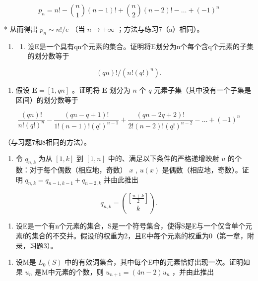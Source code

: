 \[
p _ {n} = n! - \binom {n} {1} (n - 1)! + \binom {n} {2} (n - 2)! - \dots + (- 1) ^ {n}
\]

* 从而得出 \(p_n \sim n! / e\) （当 \(n \to +\infty\) ；方法与练习7（a）相同）。

\begin{enumerate}
\def\labelenumi{\arabic{enumi}.}
\setcounter{enumi}{8}
\tightlist
\item
  \begin{enumerate}
  \def\labelenumii{(\alph{enumii})}
  \tightlist
  \item
    设E是一个具有qn个元素的集合。证明将E划分为n个每个含q个元素的子集的划分数等于
  \end{enumerate}
\end{enumerate}

\[
(q n)! / (n! (q!) ^ {n}).
\]

\begin{enumerate}
\def\labelenumi{(\alph{enumi})}
\setcounter{enumi}{1}
\tightlist
\item
  假设 \(\mathbf{E} = [1, qn]\) 。证明将 \(\mathbf{E}\) 划分为 \(n\) 个 \(q\) 元素子集（其中没有一个子集是区间）的划分数等于
\end{enumerate}

\[
\frac {(q n) !}{n ! (q !) ^ {n}} - \frac {(q n - q + 1) !}{1 ! (n - 1) ! (q !) ^ {n - 1}} + \frac {(q n - 2 q + 2) !}{2 ! (n - 2) ! (q !) ^ {n - 2}} - \dots + (- 1) ^ {n}
\]

（与习题7和8相同的方法）。

\begin{enumerate}
\def\labelenumi{\arabic{enumi}.}
\setcounter{enumi}{9}
\tightlist
\item
  令 \(q_{n,k}\) 为从 \([1, k]\) 到 \([1, n]\) 中的、满足以下条件的严格递增映射 \(u\) 的个数：对于每个偶数（相应地，奇数） \(x\) , \(u(x)\) 是偶数（相应地，奇数）。证明 \(q_{n,k} = q_{n-1, k-1} + q_{n-2, k}\) 并由此推出
\end{enumerate}

\[
q _ {n, k} = \binom {\left[ \frac {n + k}{2} \right]} {k}.
\]

\begin{enumerate}
\def\labelenumi{\arabic{enumi}.}
\setcounter{enumi}{10}
\tightlist
\item
  设E是一个有n个元素的集合，S是一个符号集合，使得S是E与一个仅含单个元素f的集合的不交并。假设f的权重为2，且E中每个元素的权重为0（第一章，附录，习题3）。
\end{enumerate}

\begin{enumerate}
\def\labelenumi{(\alph{enumi})}
\tightlist
\item
  设M是 \(L_{0}(S)\) 中的有效词集合，其中每个E中的元素恰好出现一次。证明如果 \(u_{n}\) 是M中元素的个数，则 \(u_{n+1} = (4n - 2)u_{n}\) ，并由此推出
\end{enumerate}


